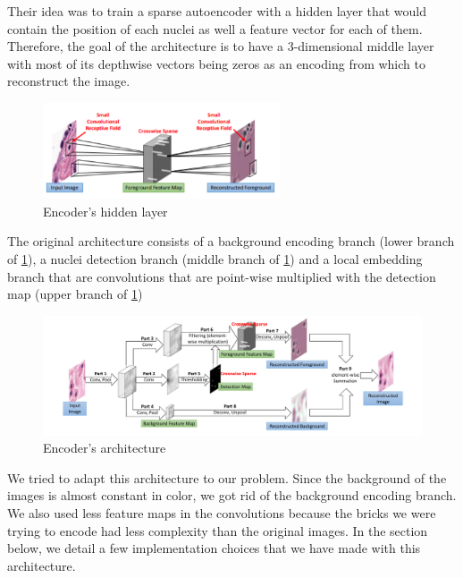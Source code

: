 \documentclass{report}
\begin{document}
Their idea was to train a sparse autoencoder with a hidden layer that would contain the position of each nuclei as well a feature vector for each of them.
Therefore, the goal of the architecture is to have a 3-dimensional middle layer with most of its depthwise vectors being zeros as an encoding from which to reconstruct the image.
\begin{figure}[!h]
\centering
\includegraphics[width=7cm]{figures/Thibault/senc_hidden.png}
\caption{Encoder's hidden layer}
\end{figure}
\newline
The original architecture consists of a background encoding branch (lower branch of \ref{fig:arc}), a nuclei detection branch (middle branch of \ref{fig:arc}) and a local embedding branch that are convolutions that are point-wise multiplied with the detection map (upper branch of \ref{fig:arc})
\begin{figure}[!h]
\centering
\includegraphics[width=17cm]{figures/Thibault/arc.png}
\caption{Encoder's architecture}
\label{fig:arc}
\end{figure}

\medskip
We tried to adapt this architecture to our problem.
Since the background of the images is almost constant in color, we got rid of the background encoding branch.
We also used less feature maps in the convolutions because the bricks we were trying to encode had less complexity than the original images.
In the section below, we detail a few implementation choices that we have made with this architecture.
\end{document}
